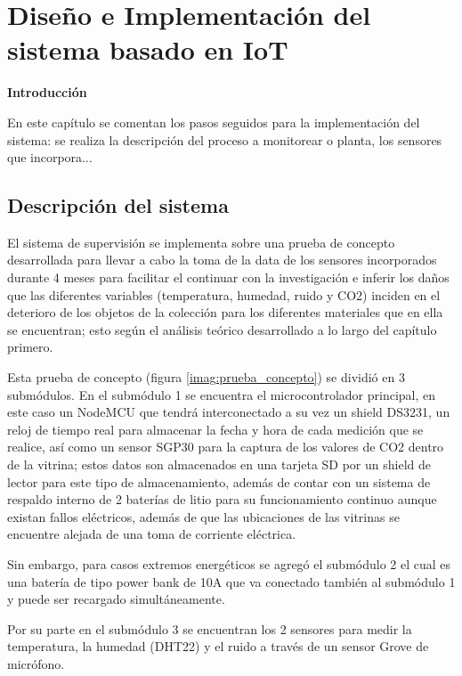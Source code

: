 \chapter{Diseño e Implementación del sistema basado en IoT}\label{cap: }

        \textbf{\Large Introducción}\newline
        
    En este capítulo se comentan los pasos seguidos para la implementación del sistema: se realiza la descripción del proceso a monitorear o planta, los sensores que incorpora...

\section{Descripción del sistema} \label{descripcion_sistema}

    El sistema de supervisión se implementa sobre una prueba de concepto desarrollada para llevar a cabo la toma de la data de los sensores incorporados durante 4 meses para facilitar el continuar con la investigación e inferir los daños que las diferentes variables (temperatura, humedad, ruido y CO2) inciden en el deterioro de los objetos de la colección para los diferentes materiales que en ella se encuentran; esto según el análisis teórico desarrollado a lo largo del capítulo primero.

    Esta prueba de concepto (figura \ref{imag:prueba_concepto}) se dividió en 3 submódulos. En el submódulo 1 se encuentra el microcontrolador principal, en este caso un NodeMCU que tendrá interconectado a su vez un shield DS3231, un reloj de tiempo real para almacenar la fecha y hora de cada medición que se realice, así como un sensor SGP30 para la captura de los valores de CO2 dentro de la vitrina; estos datos son almacenados en una tarjeta SD por un shield de lector para este tipo de almacenamiento, además de contar con un sistema de respaldo interno de 2 baterías de litio para su funcionamiento continuo aunque existan fallos eléctricos, además de que las ubicaciones de las vitrinas se encuentre alejada de una toma de corriente eléctrica.

    Sin embargo, para casos extremos energéticos se agregó el submódulo 2 el cual es una batería de tipo power bank de 10A que va conectado también al submódulo 1 y puede ser recargado simultáneamente.

    Por su parte en el submódulo 3 se encuentran los 2 sensores para medir la temperatura, la humedad (DHT22) y el ruido a través de un sensor Grove de micrófono.\\
    
